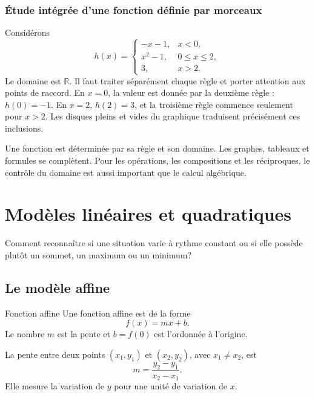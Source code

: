 \documentclass[12pt,a4paper,openany]{book}
\newcommand{\R}{\mathbb{R}}
\begin{document}
\subsection{Étude intégrée d'une fonction définie par morceaux}

Considérons
\[
h(x)=
\begin{cases}
-x-1,&x<0,\\
x^2-1,&0\leq x\leq2,\\
3,&x>2.
\end{cases}
\]
Le domaine est $\R$. Il faut traiter séparément chaque règle et porter attention aux points de raccord. En $x=0$, la valeur est donnée par la deuxième règle : $h(0)=-1$. En $x=2$, $h(2)=3$, et la troisième règle commence seulement pour $x>2$. Les disques pleins et vides du graphique traduisent précisément ces inclusions.

\begin{summarybox}
Une fonction est déterminée par sa règle et son domaine. Les graphes, tableaux et formules se complètent. Pour les opérations, les compositions et les réciproques, le contrôle du domaine est aussi important que le calcul algébrique.
\end{summarybox}


\chapter{Modèles linéaires et quadratiques}

\begin{questionbox}
Comment reconnaître si une situation varie à rythme constant ou si elle possède plutôt un sommet, un maximum ou un minimum?
\end{questionbox}

\section{Le modèle affine}

\begin{definition}{Fonction affine}{}
Une fonction affine est de la forme
\[
f(x)=mx+b.
\]
Le nombre $m$ est la pente et $b=f(0)$ est l'ordonnée à l'origine.
\end{definition}

La pente entre deux points $(x_1,y_1)$ et $(x_2,y_2)$, avec $x_1\neq x_2$, est
\[
m=\frac{y_2-y_1}{x_2-x_1}.
\]
Elle mesure la variation de $y$ pour une unité de variation de $x$.

\begin{center}
\end{center}
\end{document}
